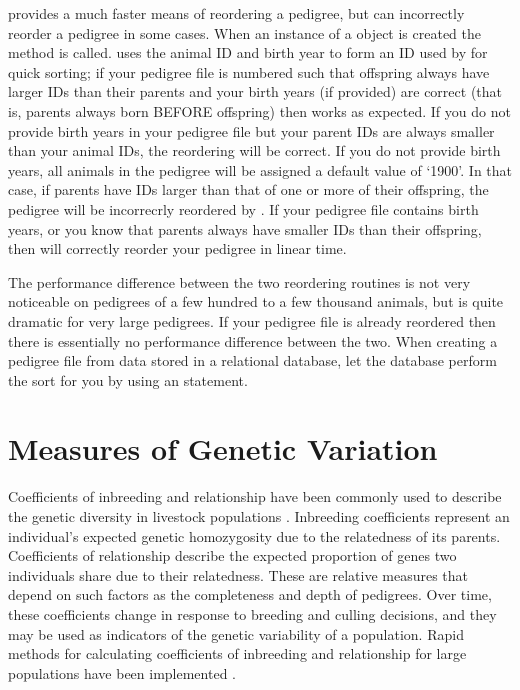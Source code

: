  provides a much faster means of reordering a pedigree, but can incorrectly reorder a pedigree in some cases.  When an instance of a  object is created the  method is called.   uses the animal ID and birth year to form an ID used by  for quick sorting; if your pedigree file is numbered such that offspring always have larger IDs than their parents and your birth years (if provided) are correct (that is, parents always born BEFORE offspring) then  works as expected.  If you do not provide birth years in your pedigree file but your parent IDs are always smaller than your animal IDs, the reordering will be correct.  If you do not provide birth years, all animals in the pedigree will be assigned a default value of `1900'.  In that case, if parents have IDs larger than that of one or more of their offspring, the pedigree will be incorrecrly reordered by .  If your pedigree file contains birth years, or you know that parents always have smaller IDs than their offspring, then  will correctly reorder your pedigree in linear time.

The performance difference between the two reordering routines is not very noticeable on pedigrees of a few hundred to a few thousand animals, but is quite dramatic for very large pedigrees.  If your pedigree file is already reordered then there is essentially no performance difference between the two.  When creating a pedigree file from data stored in a relational database, let the database perform the sort for you by using an  statement.
\section{Measures of Genetic Variation}
\label{sec:methodology-genetic-variation}
Coefficients of inbreeding and relationship \cite{Wright1922} have been commonly used to describe the genetic diversity in
livestock populations \cite{ref351}.  Inbreeding coefficients represent an individual's expected genetic homozygosity due to
the relatedness of its parents. Coefficients of relationship describe the expected proportion of genes two individuals share
due to their relatedness. These are relative measures that depend on such factors as the completeness and depth of pedigrees.
Over time, these coefficients change in response to breeding and culling decisions, and they may be used as indicators of the
genetic variability of a population. Rapid methods for calculating coefficients of inbreeding and relationship for large
populations have been implemented \cite{ref337}.

